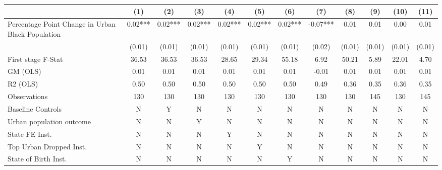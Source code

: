  \begin{tabular}{l*{11}{c}} \toprule
                    &\multicolumn{1}{c}{(1)}   &\multicolumn{1}{c}{(2)}   &\multicolumn{1}{c}{(3)}   &\multicolumn{1}{c}{(4)}   &\multicolumn{1}{c}{(5)}   &\multicolumn{1}{c}{(6)}   &\multicolumn{1}{c}{(7)}   &\multicolumn{1}{c}{(8)}   &\multicolumn{1}{c}{(9)}   &\multicolumn{1}{c}{(10)}   &\multicolumn{1}{c}{(11)}   \\
\midrule
Percentage Point Change in Urban Black Population&     0.02***&     0.02***&     0.02***&     0.02***&     0.02***&     0.02***&    -0.07***&     0.01   &     0.01   &     0.00   &     0.01   \\
                    &   (0.01)   &   (0.01)   &   (0.01)   &   (0.01)   &   (0.01)   &   (0.01)   &   (0.02)   &   (0.01)   &   (0.01)   &   (0.01)   &   (0.01)   \\
\midrule
First stage F-Stat  &    36.53   &    36.53   &    36.53   &    28.65   &    29.34   &    55.18   &     6.92   &    50.21   &     5.89   &    22.01   &     4.70   \\
GM (OLS)            &     0.01   &     0.01   &     0.01   &     0.01   &     0.01   &     0.01   &    -0.01   &     0.01   &     0.01   &     0.01   &     0.01   \\
R2 (OLS)            &     0.50   &     0.50   &     0.50   &     0.50   &     0.50   &     0.50   &     0.49   &     0.36   &     0.35   &     0.36   &     0.35   \\
Observations        &      130   &      130   &      130   &      130   &      130   &      130   &      130   &      130   &      145   &      130   &      145   \\
Baseline Controls   &        N   &        Y   &        N   &        N   &        N   &        N   &        N   &        N   &        N   &        N   &        N   \\
Urban population outcome&        N   &        N   &        Y   &        N   &        N   &        N   &        N   &        N   &        N   &        N   &        N   \\
State FE Inst.      &        N   &        N   &        N   &        Y   &        N   &        N   &        N   &        N   &        N   &        N   &        N   \\
Top Urban Dropped Inst.&        N   &        N   &        N   &        N   &        Y   &        N   &        N   &        N   &        N   &        N   &        N   \\
State of Birth Inst.&        N   &        N   &        N   &        N   &        N   &        Y   &        N   &        N   &        N   &        N   &        N   \\

\end{tabular}
